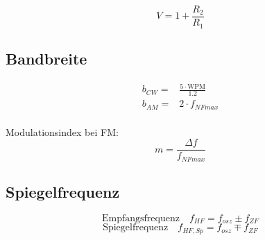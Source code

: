 \documentclass[10pt,landscape]{scrartcl}
\begin{document}
\begin{multicols}{3}
$$ V = 1 + \frac{R_{2}}{R_{1}} $$

\subsection*{Bandbreite}

\begin{align*}
b_{CW} =& \frac{5\cdot \text{WPM}}{1.2} \\
b_{AM} =& 2 \cdot f_{NFmax} \\
\end{align*}

Modulationsindex bei FM:
$$m = \frac{\Delta f}{f_{NFmax}} $$ 

\subsection*{Spiegelfrequenz}

$$ \textrm{Empfangsfrequenz}\quad f_{HF} = f_{osz} \pm f_{ZF} $$
$$ \textrm{Spiegelfrequenz}\quad f_{HF,Sp} = f_{osz} \mp f_{ZF} $$

\end{multicols}
\end{document}
